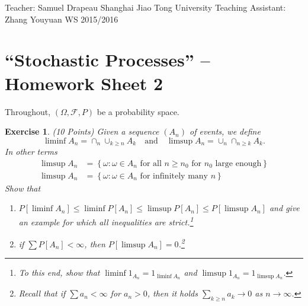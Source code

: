 \documentclass[DIV=classic,a4paper,10pt]{scrartcl}
\newtheorem{exercise}[theorem]{Exercise}
\theoremstyle{nonumberplain}
\numberwithin{equation}{section}
\begin{document}
\noindent
Teacher: Samuel Drapeau \hfill Shanghai Jiao Tong University \newline
Teaching Assistant: Zhang Youyuan \hfill WS 2015/2016

\smallskip
\noindent
\hrulefill

\smallskip

\setcounter{section}{2}

\pagestyle{empty}


\section*{``Stochastic Processes'' -- Homework Sheet 2}
\thispagestyle{empty}



Throughout, $(\Omega,\mathcal{F},P)$ be a probability space.

\begin{exercise}(10 Points)
    Given a sequence $(A_n)$ of events, we define
    \begin{equation*}
        \liminf A_n=\cap_n \cup _{k\geq n}A_k\quad \text{and}\quad \limsup A_n =\cup_n\cap_{n\geq k}A_k.
    \end{equation*}
    In other terms 
    \begin{align*}
        \limsup A_n &=\left\{ \omega\colon \omega \in A_n\text{ for all }n\geq n_0 \text{ for } n_0\text{ large enough}\right\} \\
        \limsup A_n &=\left\{ \omega\colon \omega \in A_n\text{ for infinitely many }n\right\} 
    \end{align*}
    Show that
    \begin{enumerate}[label=\textit{(\alph*)}]
        \item $P[\liminf A_n]\leq \liminf P[A_n]\leq \limsup P[A_n]\leq P[\limsup A_n]$ and give an example for which all inequalities are strict.\footnote{To this end, show that $\liminf 1_{A_n}=1_{\liminf A_n}$ and $\limsup 1_{A_n}=1_{\limsup A_n}$.}
        \item if $\sum P[A_n]<\infty$, then $P[\limsup A_n]=0$.\footnote{Recall that if $\sum a_n <\infty$ for $a_n>0$, then it holds $\sum_{k\geq n}a_k\to 0$ as $n\to \infty$.}
    \end{enumerate}
\end{exercise}
\end{document}
